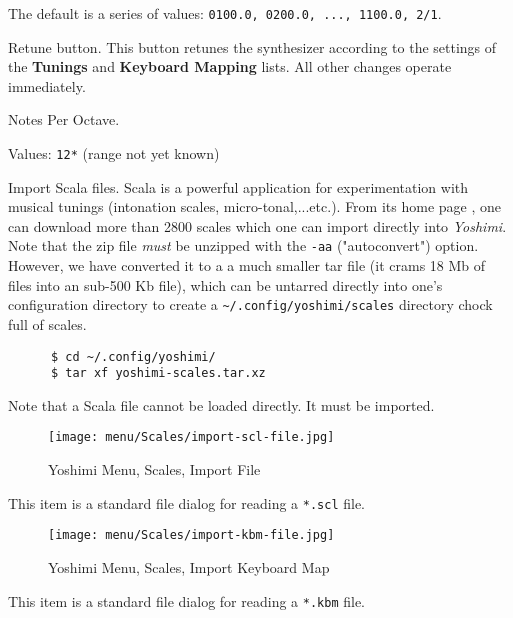    The default is a series of values:
   \texttt{0100.0, 0200.0, ..., 1100.0, 2/1}.

   Retune button.
   This button retunes the synthesizer according to the settings of
   the \textbf{Tunings} and \textbf{Keyboard Mapping} lists.
   All other changes operate immediately.

   Notes Per Octave.

   Values: \texttt{12*} (range not yet known)

   Import Scala files.
   Scala is a powerful application for experimentation with musical tunings
   (intonation scales, micro-tonal,...etc.). From its home page \cite{scala},
   one can download more than 2800 scales which one can import directly into
   \textsl{Yoshimi}.  Note that the zip file \textsl{must} be unzipped with
   the \texttt{-aa} ("autoconvert") option.  However, we have converted it to a
   a much smaller tar file (it crams 18 Mb of files into an sub-500 Kb file),
   which can be untarred directly into
   one's configuration directory to create a
   \texttt{\textasciitilde/.config/yoshimi/scales} directory chock full of
   scales.

    \begin{verbatim}
      $ cd ~/.config/yoshimi/
      $ tar xf yoshimi-scales.tar.xz
    \end{verbatim}

    Note that a Scala file cannot be loaded directly.  It must be imported.

\begin{figure}[H]
   \centering 
   \texttt{[image: menu/Scales/import-scl-file.jpg]}
   \caption{Yoshimi Menu, Scales, Import File}
   \label{fig:yoshimi_menu_scales_import_file}
\end{figure}

   This item is a standard file dialog for reading
   a \texttt{*.scl} file.

\begin{figure}[H]
   \centering 
   \texttt{[image: menu/Scales/import-kbm-file.jpg]}
   \caption{Yoshimi Menu, Scales, Import Keyboard Map}
   \label{fig:yoshimi_menu_scales_import_keyboard_map}
\end{figure}

   This item is a standard file dialog for reading
   a \texttt{*.kbm} file.

